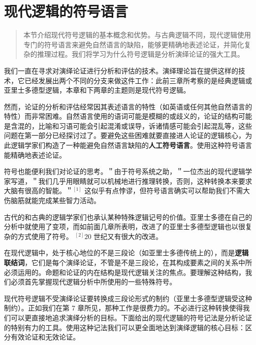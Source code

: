 \section{现代逻辑的符号语言}

\begin{quotation}
本节介绍现代符号逻辑的基本概念和优势。与古典逻辑不同，现代逻辑使用专门的符号语言来避免自然语言的缺陷，能够更精确地表述论证，并简化复杂的推理过程。我们将学习为什么符号逻辑是分析演绎论证的强大工具。
\end{quotation}

我们一直在寻求对演绎论证进行分析和评估的技术。演绎理论旨在提供这样的技术，它已经发展出两个不同的分支来做这件工作：此前三章所考察的是经典逻辑或亚里士多德型逻辑，本章和下两章的主题则是现代符号逻辑。

然而，论证的分析和评估经常因其表述语言的特性（如英语或任何其他自然语言的特性）而非常困难。自然语言使用的语词可能是模糊的或歧义的，论证的结构可能是含混的，比喻和习语可能会引起混淆或误导，诉诸情感可能会引起混乱等，这些问题在第一部分已经探讨过了。要避免这些困难就要直接进人论证的逻辑核心，为此逻辑学家们构造了一种能避免自然语言缺陷的\textbf{人工符号语言}。使用这种符号语言能精确地表述论证。

符号也能便利我们对论证的思考。＂由于符号系统之助，＂一位杰出的现代逻辑学家写道，＂我们几乎用眼睛就可以机械地进行推理转换，否则，这种转换本来要求大脑有很高的智能。＂${ }^{[1]}$ 这似乎有点悖谬，但符号语言确实可以帮助我们不需大伤脑筋就能完成某些智力活动。

古代的和古典的逻辑学家们也承认某种特殊逻辑记号的价值。亚里士多德在自己的分析中就使用了变项，而如前面几章所表明，改进了的亚里士多德型逻辑也以很复杂的方式使用了符号。 ${ }^{[2]} 20$ 世纪又有很大的改进。

在现代逻辑中，处于核心地位的不是三段论（如亚里士多德传统上的），而是\textbf{逻辑联结词}，它们是每个演绎论证，不管是不是三段论，在其构成要素之间的关系中所必须运用的。命题和论证的内在结构是现代逻辑关注的焦点。要理解这种结构，我们必须首先掌握现代逻辑分析中所使用的一些特殊符号。

现代符号逻辑不受演绎论证要转换成三段论形式的制约（亚里士多德型逻辑受这种制约）。正如我们在第 7 章所见，那种工作是很费力的。不必进行这种转换使得我们可以更直接地追求演绎分析的目标。下面给出的现代逻辑的符号记法是分析论证的特别有力的工具。使用这种记法我们可以更全面地达到演绎逻辑的核心目标：区分有效论证和无效论证。

